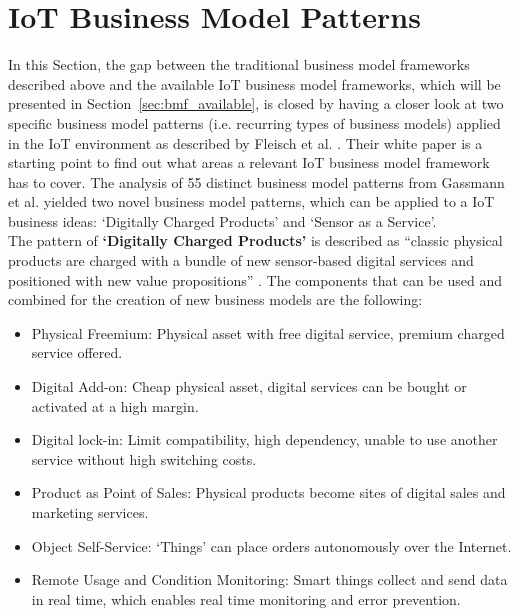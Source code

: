 \section{IoT Business Model Patterns}
\label{sec:patterns}	
\vspace{-1em}
	In this Section, the gap between the traditional business model frameworks described above and the available IoT business model frameworks, which will be presented in Section~\ref{sec:bmf_available}, is closed by having a closer look at two specific business model patterns (i.e. recurring types of business models) applied in the IoT environment as described by Fleisch et al. \cite{fleisch}. Their white paper is a starting point to find out what areas a relevant IoT business model framework has to cover. The analysis of 55 distinct business model patterns from Gassmann et al. \cite{gassmann55} yielded two novel business model patterns, which can be applied to a IoT business ideas: `Digitally Charged Products' and `Sensor as a Service'.\\
	The pattern of \textbf{`Digitally Charged Products'} is described as ``classic physical products are charged with a bundle of new sensor-based digital services and positioned with new value propositions'' \cite{fleisch}. The components that can be used and combined for the creation of new business models are the following:

	\begin{itemize}
		\item Physical Freemium: Physical asset with free digital service, premium charged service offered.
		\item Digital Add-on: Cheap physical asset, digital services can be bought or activated at a high margin.
		\item Digital lock-in: Limit compatibility, high dependency, unable to use another service without high switching costs.
		\item Product as Point of Sales: Physical products become sites of digital sales and marketing services.
		\item Object Self-Service: `Things' can place orders autonomously over the Internet. 
		\item Remote Usage and Condition Monitoring: Smart things collect and send data in real time, which enables real time monitoring and error prevention.
	\end{itemize}

